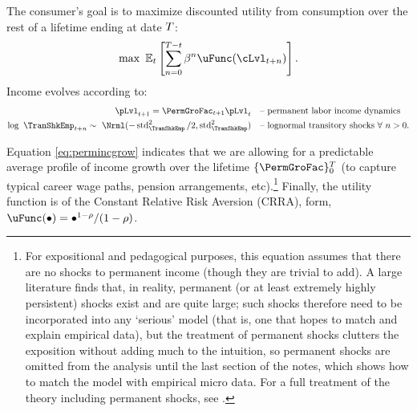 The consumer's goal is to maximize discounted utility from consumption over the rest of a lifetime ending at date $T$:
  \begin{equation}\label{eq:MaxProb}
    \max~\Ex_{\prd}\left[\sum_{n=0}^{\trmT-\prd}\DiscFac^{n} \uFunc(\cLvl_{\prd+n})\right].
  \end{equation}
Income evolves according to:
  \begin{equation}\begin{gathered}\begin{aligned}
        \pLvl_{\prd+1}   = \PermGroFac_{\prd+1}\pLvl_{\prd}                                        & \text{~~ -- permanent labor income dynamics} \label{eq:permincgrow}
        \\ \log ~ \TranShkEmp_{t+n}  \sim ~\Nrml(-\std_{\TranShkEmp}^{2}/2,\std_{\TranShkEmp}^{2}) & \text{~~ -- lognormal transitory shocks}~\forall~n>0 .
      \end{aligned}\end{gathered}\end{equation}

Equation \eqref{eq:permincgrow} indicates that we are allowing for a predictable average profile of income growth over the lifetime $\{\PermGroFac\}_{0}^{T}$ (to capture typical career wage paths, pension arrangements, etc).\footnote{For expositional and pedagogical purposes, this equation assumes that there are no shocks to permanent income (though they are trivial to add).  A large literature finds that, in reality, permanent (or at least extremely highly persistent) shocks exist and are quite large; such shocks therefore need to be incorporated into any `serious' model (that is, one that hopes to match and explain empirical data), but the treatment of permanent shocks clutters the exposition without adding much to the intuition, so permanent shocks are omitted from the analysis until the last section of the notes, which shows how to match the model with empirical micro data.  For a full treatment of the theory including permanent shocks, see \cite{BufferStockTheory}.}  Finally, the utility function is of the Constant Relative Risk Aversion (CRRA), form, $\uFunc(\bullet) = \bullet^{1-\CRRA}/(1-\CRRA)$.

